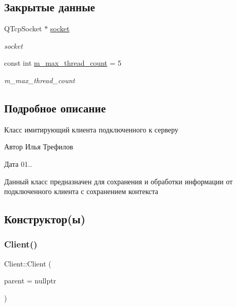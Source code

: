 \subsection*{Закрытые данные}
\begin{DoxyCompactItemize}
\item 
Q\+Tcp\+Socket $\ast$ \hyperlink{classClient_acfb33719fbe6b0685ca7324c0ee893c5}{socket}
\begin{DoxyCompactList}\small\item\em socket \end{DoxyCompactList}\item 
const int \hyperlink{classClient_a61dd7284140818bcb19dbd5bcccec846}{m\+\_\+max\+\_\+thread\+\_\+count} = 5
\begin{DoxyCompactList}\small\item\em m\+\_\+max\+\_\+thread\+\_\+count \end{DoxyCompactList}\end{DoxyCompactItemize}


\subsection{Подробное описание}
Класс имитирующий клиента подключенного к серверу 

\begin{DoxyAuthor}{Автор}
Илья Трефилов 
\end{DoxyAuthor}
\begin{DoxyDate}{Дата}
01..
\end{DoxyDate}
Данный класс предназначен для сохранения и обработки информации от подключенного клиента с сохранением контекста 

\subsection{Конструктор(ы)}
\mbox{\label{classClient_a5b62b1caeb5c2c35a2ae367851d3ad92}} 
\subsubsection{\texorpdfstring{Client()}{Client()}}
{\footnotesize\ttfamily Client\+::\+Client (\begin{DoxyParamCaption}\item[{Q\+Object $\ast$}]{parent = {\ttfamily nullptr} }\end{DoxyParamCaption})\hspace{0.3cm}{\ttfamily [explicit]}}



